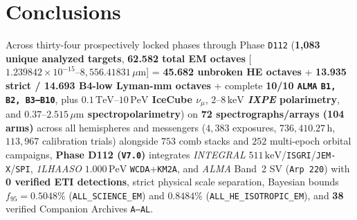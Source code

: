 \documentclass[twocolumn,10pt]{article}
\begin{document}
\section{Conclusions}
Across thirty-four prospectively locked phases through Phase \texttt{D112} (\textbf{1,083 unique analyzed targets}, \textbf{62.582 total EM octaves} [$1.239842\times 10^{-15}\text{--}8{,}556.41831\,\mu\text{m}$] = \textbf{45.682 unbroken HE octaves} + \textbf{13.935 strict / 14.693 B4-low Lyman-mm octaves} + complete \textbf{10/10 \texttt{ALMA} \texttt{B1, B2, B3--B10}}, plus \textbf{$0.1\,\mathrm{TeV}\text{--}10\,\mathrm{PeV}$ IceCube $\nu_\mu$}, \textbf{$2\text{--}8\,\mathrm{keV}$ \textit{IXPE} polarimetry}, and \textbf{$0.37\text{--}2.515\,\mu\text{m}$ spectropolarimetry}) on \textbf{72 spectrographs/arrays (104 arms)} across all hemispheres and messengers ($4{,}383$ exposures, $736{,}410.27\,\text{h}$, $113{,}967$ calibration trials) alongside $753$ comb stacks and $252$ multi-epoch orbital campaigns, \textbf{Phase D112 (\texttt{V7.0})} integrates \textit{INTEGRAL} $511\,\mathrm{keV}$/\texttt{ISGRI}/\texttt{JEM-X}/\texttt{SPI}, \textit{1LHAASO} $1.000\,\mathrm{PeV}$ \texttt{WCDA}+\texttt{KM2A}, and \textit{ALMA} Band~2 SV (\texttt{Arp\,220}) with \textbf{0 verified ETI detections}, strict physical scale separation, Bayesian bounds $f_{95} = \mathbf{0.5048\%}$ (\texttt{ALL\_SCIENCE\_EM}) and $\mathbf{0.8484\%}$ (\texttt{ALL\_HE\_ISOTROPIC\_EM}), and \textbf{38} verified Companion Archives \texttt{A--AL}.

\clearpage
\end{document}
